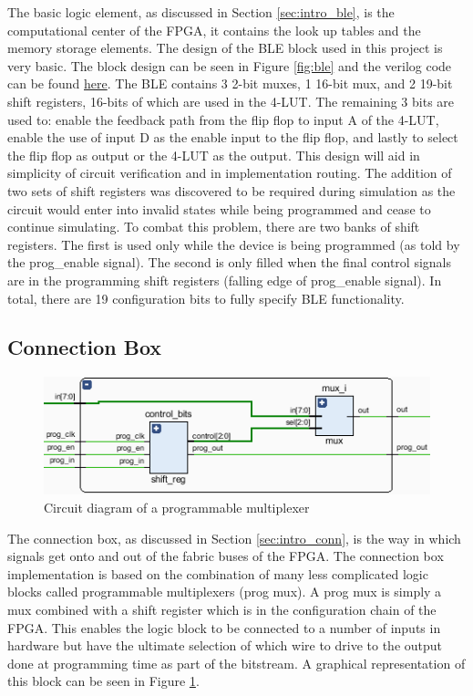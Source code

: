 \documentclass[12pt]{article}
\begin{document}
The basic logic element, as discussed in Section \ref{sec:intro_ble}, is the computational
center of the FPGA, it contains the look up tables and the memory storage elements.
The design of the BLE block used in this project is very basic. The block design can be seen in Figure 
\ref{fig:ble} and the verilog code can be found \href{https://github.com/JosephPrachar/fpga/blob/master/src/logic_element.v}{here}.
The BLE contains 3 2-bit muxes,
1 16-bit mux, and 2 19-bit shift registers, 16-bits of which are used in the
4-LUT. The remaining 3 bits are used to: enable the feedback path from the flip flop 
to input A of the 4-LUT, enable the use of input D as the enable input to the flip 
flop, and lastly to select the flip flop as output or the 4-LUT as the output. This 
design will aid in simplicity of circuit verification and in implementation routing.
The addition of two sets of shift registers was discovered to be required during 
simulation as the circuit would enter into invalid states while being programmed and cease
to continue simulating. 
To combat this problem, there are two banks of shift registers. The first is used 
only while the device is being programmed (as told by the prog{\_}enable signal). The 
second is only filled when the final control signals are in the programming shift 
registers (falling edge of prog{\_}enable signal). In total, there are 19 configuration
bits to fully specify BLE functionality.

\subsection{Connection Box}

\begin{figure}[ht]
    \centering
    \includegraphics[width=\textwidth]{prog_mux}
    \caption{Circuit diagram of a programmable multiplexer}
    \label{fig:prog_mux}
\end{figure}

The connection box, as discussed in Section \ref{sec:intro_conn}, is the way in which signals
get onto and out of the fabric buses of the FPGA. 
The connection box implementation is based on the combination of many less complicated
logic blocks called programmable multiplexers (prog mux). A prog mux is simply a mux combined with
a shift register which is in the configuration chain of the FPGA. This enables the logic
block to be connected to a number of inputs in hardware but have the ultimate selection
of which wire to drive to the output done at programming time as part of the bitstream. 
A graphical representation of this block can be seen in Figure \ref{fig:prog_mux}.
\end{document}
